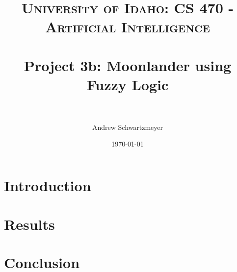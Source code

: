 \documentclass[12pt, article]{scrartcl}
\title{	
\normalfont \normalsize 
\textsc{University of Idaho: CS 470 - Artificial Intelligence} \\ [25pt]
\horrule{0.5pt} \\[0.4cm]
\huge Project 3b: Moonlander using Fuzzy Logic\\
\horrule{2pt} \\[0.5cm]
}
\author{Andrew Schwartzmeyer}
\date{\normalsize\today}
\begin{document}
\maketitle 
\begin{abstract}
\end{abstract}
\pagebreak
\section{Introduction}
\section{Results}
\section{Conclusion}
\end{document}

